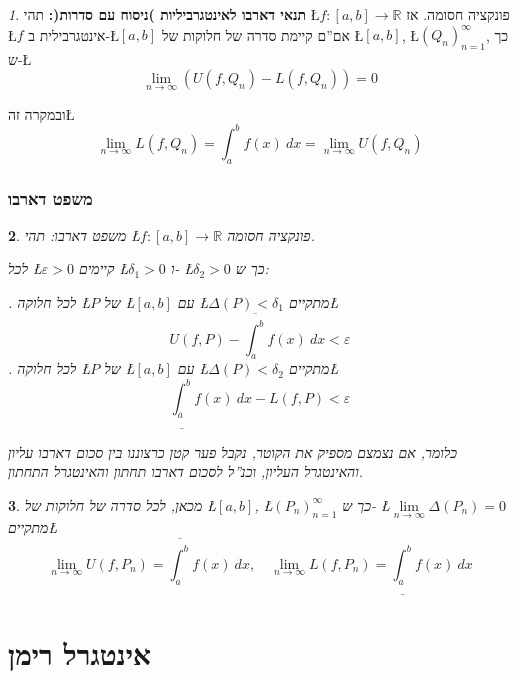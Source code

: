 \documentclass[english,hebrew]{article}
\theoremstyle{remark}
\theoremstyle{definition}
\theoremstyle{plain}
\newtheorem{thm}{\protect\theoremname}
\theoremstyle{remark}
\newtheorem{claim}[thm]{\protect\claimname}
\theoremstyle{plain}
\newtheorem{cor}[thm]{\protect\corollaryname}
\theoremstyle{plain}
\theoremstyle{definition}
\theoremstyle{plain}
\providecommand{\claimname}{טענה}
\providecommand{\corollaryname}{מסקנה}
\providecommand{\theoremname}{משפט}
\begin{document}
\begin{claim}
\textbf{תנאי דארבו לאינטגרביליות )ניסוח עם סדרות(: }תהי \L{$f:\left[a,b\right]\rightarrow\mathbb{R}$}
פונקציה חסומה. אז \L{$f$} אינטגרבילית ב-\L{$\left[a,b\right]$} אם\textquotedblright ם
קיימת סדרה של חלוקות של \L{$\left[a,b\right]$}, \L{$\left(Q_{n}\right)_{n=1}^{\infty}$},
כך ש-\L{%
\[
\underset{n\rightarrow\infty}{\lim}\left(U\left(f,Q_{n}\right)-L\left(f,Q_{n}\right)\right)=0
\]
}%

ובמקרה זה\L{%
\[
\underset{n\rightarrow\infty}{\lim}L\left(f,Q_{n}\right)=\int_{a}^{b}f(x)\ dx=\underset{n\rightarrow\infty}{\lim}U\left(f,Q_{n}\right)
\]
}%
\end{claim}

\section{משפט דארבו}
\begin{thm}
משפט דארבו: תהי \L{$f:\left[a,b\right]\rightarrow\mathbb{R}$} פונקציה
חסומה.

לכל \L{$\varepsilon>0$} קיימים \L{$\delta_{1}>0$} ו- \L{$\delta_{2}>0$}
כך ש:

{\endL}. לכל חלוקה \L{$P$} של \L{$\left[a,b\right]$} עם
\L{$\Delta\left(P\right)<\delta_{1}$} מתקיים\L{%
\[
U\left(f,P\right)-\overline{\int_{a}^{b}}f(x)\ dx<\varepsilon
\]
}%
{\endL}. לכל חלוקה \L{$P$} של \L{$\left[a,b\right]$} עם
\L{$\Delta\left(P\right)<\delta_{2}$} מתקיים\L{%
\[
\underline{\int_{a}^{b}}f(x)\ dx-L\left(f,P\right)<\varepsilon
\]
}%

כלומר, אם נצמצם מספיק את הקוטר, נקבל פער קטן כרצוננו בין סכום דארבו
עליון והאינטגרל העליון, וכנ\textquotedblright ל לסכום דארבו תחתון
והאינטגרל התחתון.
\end{thm}

\begin{cor}
מכאן, לכל סדרה של חלוקות של \L{$\left[a,b\right]$}, \L{$\left(P_{n}\right)_{n=1}^{\infty}$}
כך ש- \L{$\underset{n\rightarrow\infty}{\lim}\Delta\left(P_{n}\right)=0$}
מתקיים\L{%
\[
\underset{n\rightarrow\infty}{\lim}U\left(f,P_{n}\right)=\overline{\int_{a}^{b}}f(x)\ dx,\quad\underset{n\rightarrow\infty}{\lim}L\left(f,P_{n}\right)=\underline{\int_{a}^{b}}f(x)\ dx
\]
}%
\end{cor}

\part{אינטגרל רימן}
\end{document}
